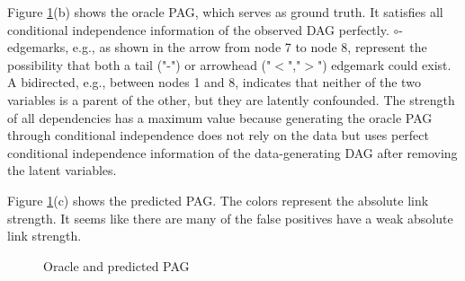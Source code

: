 \documentclass[conference]{IEEEtran}
\begin{document}
Figure \ref{fig:predicted}(b) shows the oracle PAG, which serves as ground truth. It satisfies all conditional independence information of the observed DAG perfectly.
$\circ$-edgemarks, e.g., as shown in the arrow from node 7 to node 8, represent the possibility that both a tail ("-") or arrowhead ("$<$","$>$") edgemark could exist.
A bidirected, e.g., between nodes 1 and 8, indicates that neither of the two variables is a parent of the other, but they are latently confounded.
The strength of all dependencies has a maximum value because generating the oracle PAG through conditional independence does not rely on the data but uses perfect conditional independence information of the data-generating DAG after removing the latent variables.

Figure \ref{fig:predicted}(c) shows the predicted PAG. The colors represent the absolute link strength. It seems like there are many of the false positives have a weak absolute link strength.
\begin{figure}[htbp]
    \centering
    \caption{Oracle and predicted PAG}
        \label{fig:predicted}
\end{figure}
\end{document}
